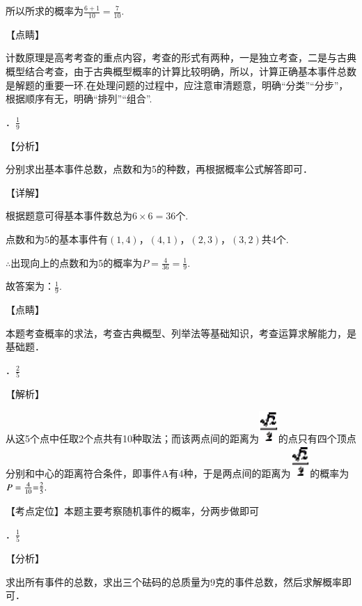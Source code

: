 \documentclass[a4paper,11pt,UTF8,twoside]{ctexart} %
\begin{document}
\noindent 所以所求的概率为$\frac{6+1}{10} =\frac{7}{10} $.

\noindent 【点睛】

\noindent 计数原理是高考考查的重点内容，考查的形式有两种，一是独立考查，二是与古典概型结合考查，由于古典概型概率的计算比较明确，所以，计算正确基本事件总数是解题的重要一环.在处理问题的过程中，应注意审清题意，明确``分类''``分步''，根据顺序有无，明确``排列''``组合''.

．$\frac{1}{9} $

\noindent 【分析】

\noindent 分别求出基本事件总数，点数和为5的种数，再根据概率公式解答即可．

\noindent 【详解】

\noindent 根据题意可得基本事件数总为$6\times 6=36$个.

\noindent 点数和为5的基本事件有$\left(1,4\right)$，$\left(4,1\right)$，$\left(2,3\right)$，$\left(3,2\right)$共4个.

\noindent $\mathrm{\therefore}$出现向上的点数和为5的概率为$P=\frac{4}{36} =\frac{1}{9} $.

\noindent 故答案为：$\frac{1}{9} $.

\noindent 【点睛】

\noindent 本题考查概率的求法，考查古典概型、列举法等基础知识，考查运算求解能力，是基础题．

．$\frac{2}{5} $

\noindent 【解析】

\noindent 从这5个点中任取2个点共有10种取法；而该两点间的距离为\includegraphics*[width=0.29in, height=0.47in, keepaspectratio=false]{image290}的点只有四个顶点分别和中心的距离符合条件，即事件A有4种，于是两点间的距离为\includegraphics*[width=0.29in, height=0.47in, keepaspectratio=false]{image291}的概率为$P=\frac{4}{10} {\rm =}\frac{2}{5} .$

\noindent 【考点定位】本题主要考察随机事件的概率，分两步做即可

．$\frac{1}{5} $

\noindent 【分析】

\noindent 求出所有事件的总数，求出三个砝码的总质量为9克的事件总数，然后求解概率即可．
\end{document}
